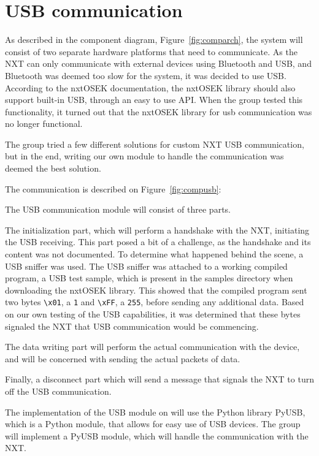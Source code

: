 \section{USB communication}
\label{sec:usbdes}
As described in the component diagram, Figure~\ref{fig:comparch}, the system will consist of two separate hardware platforms that need to communicate.
As the NXT can only communicate with external devices using Bluetooth and USB, and Bluetooth was deemed too slow for the system, it was decided to use USB.
According to the nxtOSEK documentation, the nxtOSEK library should also support built-in USB, through an easy to use API\cite{ecrobotUSB}.
When the group tested this functionality, it turned out that the nxtOSEK library for usb communication was no longer functional.

The group tried a few different solutions for custom NXT USB communication, but in the end, writing our own module to handle the communication was deemed the best solution.

The communication is described on Figure~\ref{fig:compusb}:


The USB communication module will consist of three parts.

The initialization part, which will perform a handshake with the NXT, initiating the USB receiving.
This part posed a bit of a challenge, as the handshake and its content was not documented.
To determine what happened behind the scene, a USB sniffer was used.
The USB sniffer was attached to a working compiled program, a USB test sample, which is present in the samples directory when downloading the nxtOSEK library\cite{ecrobotUSB}.
This showed that the compiled program sent two bytes \texttt{\textbackslash{}x01}, a \texttt{1} and \texttt{\textbackslash{}xFF}, a \texttt{255}, before sending any additional data.%
Based on our own testing of the USB capabilities, it was determined that these bytes signaled the NXT that USB communication would be commencing.

The data writing part will perform the actual communication with the device, and will be concerned with sending the actual packets of data.

Finally, a disconnect part which will send a message that signals the NXT to turn off the USB communication.

The implementation of the USB module on will use the Python library PyUSB, which is a Python module, that allows for easy use of USB devices\cite{PyUSB}.
The group will implement a PyUSB module, which will handle the communication with the NXT.
